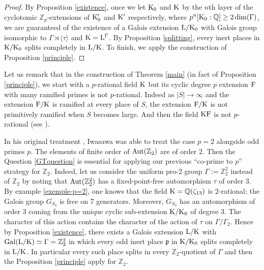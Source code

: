 \documentclass[12pt,a4paper,twoside,english]{smfart}
\def\K{{\rm K}}
\def\L{{\rm L}}
\def\F{{\rm F}}
\def\Q{{\mathbb Q}}
\def\Z{{\mathbb Z}}
\def\p{{\mathfrak p}}
\def\Gal{{\rm Gal}}
\def\Aut{{\rm Aut}}
\begin{document}
 \begin{proof}
 By Proposition \ref{existence}, once we let $\K_0$ and $\K$ by the $n$th layer of the cyclotomic $\Z_p$-extensions of $\K_0'$ and $\K'$ respectively, where $p^n[\K_0:\Q]\geq 2 \dim(\Gamma)$, we are guaranteed of the existence of a Galois extension $\L/\K_0$ with Galois group isomorphic to $\Gamma \rtimes  \langle \tau \rangle$ and $\K=\L^{\Gamma}$. By Proposition \ref{splitting}, every inert places  in $\K/\K_0$ splits completely in $\L/\K$.
To finish, we apply the construction of Proposition \ref{principle}. 
 \end{proof}
 

 \begin{rema}
Let us remark that in the construction  of Theorem \ref{main} (in fact of Proposition \ref{principle}),  we start with a $p$-rational field $\K $  but its cyclic degree $p$ extension $\F$ with many ramified primes is not $p$-rational. Indeed as $|S| \rightarrow \infty$ and the extension $\F/\K$ is ramified at every place of $S$, the extension $\F/\K$ is not primitively ramified when $S$ becomes large. And then the field $\K\F$ is not $p$-rational (see \cite[Chapter IV, \S 3]{gras}).
 \end{rema}
 
 
 \begin{rema} In his original treatment \cite{Iwasawa}, Iwasawa was able to treat the case $p=2$ alongside odd primes $p$.  The elements of finite order of  $\Aut(\Z_2)$ are of order $2$. Then the Question \ref{GTquestion} is essential  for applying our previous ``co-prime to $p$'' 
 strategy for  $\Z_2$. Indeed, let us consider the uniform pro-$2$ group $\Gamma:=\Z_2^2$ instead of $\Z_2$ by noting that 
 $\Aut(\Z_2^2)$ has a fixed-point-free automorphism $\tau$ of order $3$. By example \ref{exemple-p=2}, one knows that the field  $\K=\Q(\zeta_{13})$ is $2$-rational; the Galois group $G_{S_2}$ is free on $7$ generators. Moreover, $G_{S_2}$ has an automorphism of order $3$ coming from the unique cyclic sub-extension $\K/\K_0$ of degree $3$. The character of this action contains the character of the action of $\tau$ on $\Gamma/\Gamma_2$. Hence by Proposition \ref{existence}, there exists a Galois extension $\L/\K$ with $\Gal(\L/\K) \simeq \Gamma = \Z_2^2$ in which every odd inert place $\p$ in $\K/\K_0$ splits completely in $\L/\K$. In particular every such place splits in every $\Z_2$-quotient of $\Gamma$ and then  the Proposition \ref{principle} apply for $\Z_2$.
\end{rema} 
 
\end{document}
